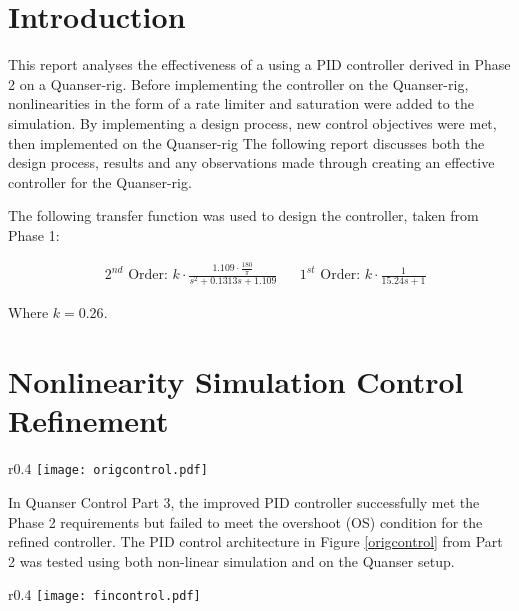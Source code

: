 \section{Introduction}\label{introduction}

This report analyses the effectiveness of a using a PID controller
derived in Phase 2 on a Quanser-rig. Before implementing the controller
on the Quanser-rig, nonlinearities in the form of a rate limiter and
saturation were added to the simulation. By implementing a design
process, new control objectives were met, then implemented on the
Quanser-rig The following report discusses both the design process,
results and any observations made through creating an effective
controller for the Quanser-rig.

The following transfer function was used to design the controller, taken
from Phase 1:

\begin{align*}
&\text{$2^{nd}$ Order: }k \cdot \frac { 1.109\cdot \frac{180} {\pi} }{ s^2 + 0.1313s +1.109 }
&&\text{$1^{st}$ Order: }k \cdot \frac { 1 }{ 15.24s +1 }
\end{align*}

Where \(k = 0.26\).

\section{Nonlinearity Simulation Control
Refinement}\label{nonlinearity-simulation-control-refinement}

\begin{wrapfigure}{r}{0.4\textwidth}
 \vspace{-25pt}
 \centering
  \texttt{[image: origcontrol.pdf]}
\vspace{-10pt}
  \caption{Showing original Controller Architecture}
  \vspace{-25pt}
  \label{origcontrol}
 \end{wrapfigure}

In Quanser Control Part 3, the improved PID controller successfully met
the Phase 2 requirements but failed to meet the overshoot (OS) condition
for the refined controller. The PID control architecture in Figure
\ref{origcontrol} from Part 2 was tested using both non-linear
simulation and on the Quanser setup.

\begin{wrapfigure}{r}{0.4\textwidth}
 \vspace{-25pt}
 \centering
  \texttt{[image: fincontrol.pdf]}
\vspace{-10pt}
  \caption{Showing Improved Controller Architecture}
  \vspace{-20pt}
  \label{fincontrol}
 \end{wrapfigure}

